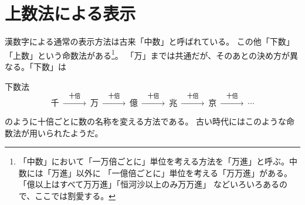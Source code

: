 \documentclass[dvipdfmx]{jsarticle}
\begin{document}
\section{上数法による表示}
漢数字による通常の表示方法は古来「中数」と呼ばれている。
この他「下数」「上数」という命数法がある\footnote{%
「中数」において「一万倍ごとに」単位を考える方法を「万進」と呼ぶ。中数には「万進」以外に
「一億倍ごとに」単位を考える「万万進」がある。「億以上はすべて万万進」「恒河沙以上のみ万万進」
などいろいろあるので、ここでは割愛する。}。
「万」までは共通だが、そのあとの決め方が異なる。「下数」は
\begin{itembox}[l]{下数法}
\[
\text{千}
\ \xrightarrow{\quad\text{十倍}\quad}\ {}
\text{万}
\ \xrightarrow{\quad\text{十倍}\quad}\ {}
\text{億}
\ \xrightarrow{\quad\text{十倍}\quad}\ {}
\text{兆}
\ \xrightarrow{\quad\text{十倍}\quad}\ {}
\text{京}
\ \xrightarrow{\quad\text{十倍}\quad}\ {}\cdots
\]
\end{itembox}
のように十倍ごとに数の名称を変える方法である。
古い時代にはこのような命数法が用いられたようだ。
\end{document}
